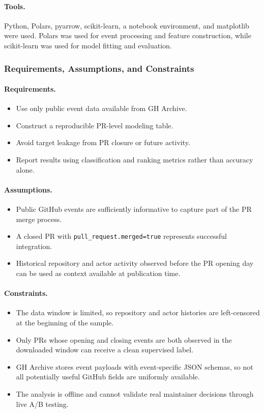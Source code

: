\paragraph{Tools.}
Python, Polars, pyarrow, scikit-learn, a notebook environment, and matplotlib were used. Polars was used for
event processing and feature construction, while scikit-learn was used for model fitting and evaluation.

\subsubsection*{Requirements, Assumptions, and Constraints}

\paragraph{Requirements.}
\begin{itemize}
    \item Use only public event data available from GH Archive.
    \item Construct a reproducible PR-level modeling table.
    \item Avoid target leakage from PR closure or future activity.
    \item Report results using classification and ranking metrics rather than accuracy alone.
\end{itemize}

\paragraph{Assumptions.}
\begin{itemize}
    \item Public GitHub events are sufficiently informative to capture part of the PR merge process.
    \item A closed PR with \texttt{pull\_request.merged=true} represents successful integration.
    \item Historical repository and actor activity observed before the PR opening day can be used as context
        available at publication time.
\end{itemize}

\paragraph{Constraints.}
\begin{itemize}
    \item The data window is limited, so repository and actor histories are left-censored at the beginning of
        the sample.
    \item Only PRs whose opening and closing events are both observed in the downloaded window can receive a
        clean supervised label.
    \item GH Archive stores event payloads with event-specific JSON schemas, so not all potentially useful
        GitHub fields are uniformly available.
    \item The analysis is offline and cannot validate real maintainer decisions through live A/B testing.
\end{itemize}

